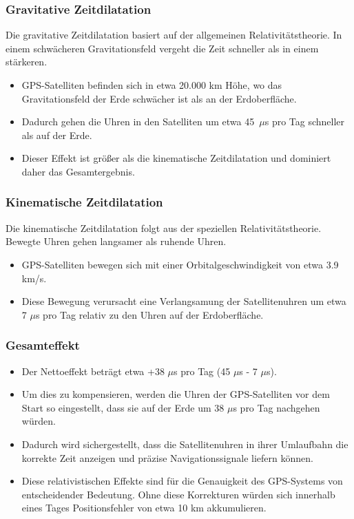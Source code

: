 \documentclass[a4paper,12pt]{article}
\begin{document}
	\subsubsection{Gravitative Zeitdilatation}
	Die gravitative Zeitdilatation basiert auf der allgemeinen Relativitätstheorie. In einem schwächeren Gravitationsfeld vergeht die Zeit schneller als in einem stärkeren.
	\begin{itemize}
		\item GPS-Satelliten befinden sich in etwa 20.000 km Höhe, wo das Gravitationsfeld der Erde schwächer ist als an der Erdoberfläche.
		\item Dadurch gehen die Uhren in den Satelliten um etwa 45~$\mu$s pro Tag schneller als auf der Erde.
		\item Dieser Effekt ist größer als die kinematische Zeitdilatation und dominiert daher das Gesamtergebnis.
	\end{itemize}
	
	\subsubsection{Kinematische Zeitdilatation}
	Die kinematische Zeitdilatation folgt aus der speziellen Relativitätstheorie. Bewegte Uhren gehen langsamer als ruhende Uhren.
	\begin{itemize}
		\item GPS-Satelliten bewegen sich mit einer Orbitalgeschwindigkeit von etwa 3.9 km/s.
		\item Diese Bewegung verursacht eine Verlangsamung der Satellitenuhren um etwa 7 $\mu$s pro Tag relativ zu den Uhren auf der Erdoberfläche.
	\end{itemize}
	
	\subsubsection{Gesamteffekt}
	\begin{itemize}
		\item Der Nettoeffekt beträgt etwa +38 $\mu$s pro Tag (45 $\mu$s - 7 $\mu$s).
		\item Um dies zu kompensieren, werden die Uhren der GPS-Satelliten vor dem Start so eingestellt, dass sie auf der Erde um 38 $\mu$s pro Tag nachgehen würden.
		\item Dadurch wird sichergestellt, dass die Satellitenuhren in ihrer Umlaufbahn die korrekte Zeit anzeigen und präzise Navigationssignale liefern können.
		\item Diese relativistischen Effekte sind für die Genauigkeit des GPS-Systems von entscheidender Bedeutung. Ohne diese Korrekturen würden sich innerhalb eines Tages Positionsfehler von etwa 10 km akkumulieren.
	\end{itemize}
	
\end{document}
